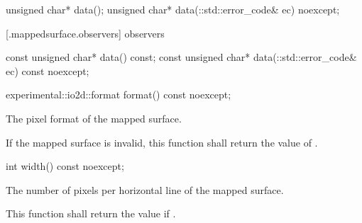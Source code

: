 \begin{itemdecl}
    unsigned char* data();
    unsigned char* data(::std::error_code& ec) noexcept;
\end{itemdecl}
\begin{itemdescr}
	\pnum
	\postconditions
	
\end{itemdescr}

 [\iotwod.mappedsurface.observers]{ observers}

\begin{itemdecl}
    const unsigned char* data() const;
    const unsigned char* data(::std::error_code& ec) const noexcept;
\end{itemdecl}
\begin{itemdescr}
	\pnum
	\returns

\end{itemdescr}

\begin{itemdecl}
    experimental::io2d::format format() const noexcept;
\end{itemdecl}
\begin{itemdescr}
	\pnum
	\returns
	The pixel format of the mapped surface.
	
	\pnum
	\remarks
	If the mapped surface is invalid, this function shall return the value of .
	
\end{itemdescr}

\begin{itemdecl}
    int width() const noexcept;
\end{itemdecl}
\begin{itemdescr}
	\pnum
	\returns
	The number of pixels per horizontal line of the mapped surface.
	
	\pnum
	\remarks
	This function shall return the value  if .
	
\end{itemdescr}

